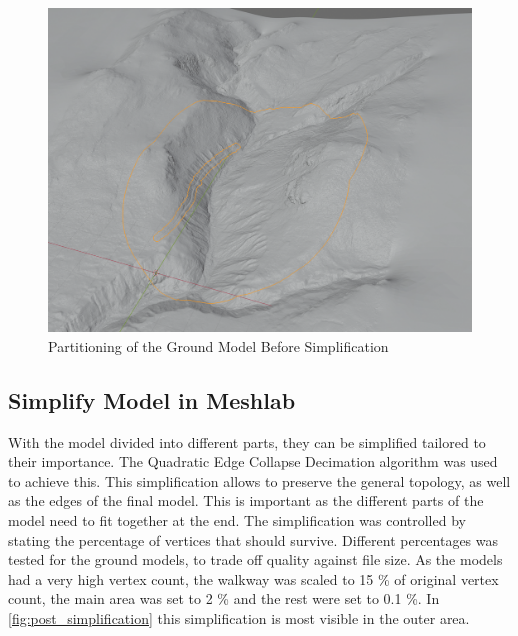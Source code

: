         \FloatBarrier
        \begin{figure}[htbp]
            \centering
            \includegraphics[width=\ImageWidth]{figures/ground_partitioning.PNG}
            \caption{Partitioning of the Ground Model Before Simplification}
            \label{fig:model_original}
        \end{figure}
        \FloatBarrier
    
    \subsection{Simplify Model in Meshlab}
        With the model divided into different parts, they can be simplified tailored to their importance. The Quadratic Edge Collapse Decimation algorithm was used to achieve this. This simplification allows to preserve the general topology, as well as the edges of the final model. This is important as the different parts of the model need to fit together at the end. The simplification was controlled by stating the percentage of vertices that should survive. Different percentages was tested for the ground models, to trade off quality against file size. As the models had a very high vertex count, the walkway was scaled to 15 \% of original vertex count, the main area was set to 2 \% and the rest were set to 0.1 \%. In \cref{fig:post_simplification} this simplification is most visible in the outer area.
        
